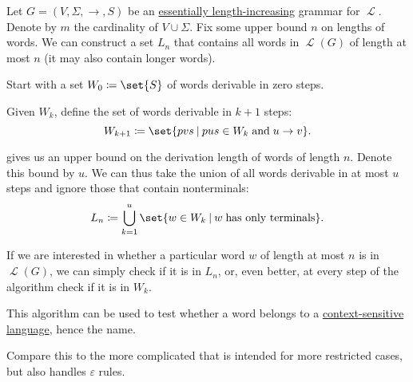 \begin{algorithm}\label{alg:length_increasing_grammar}
  Let \( G = (V, \Sigma, \to, S) \) be an \hyperref[def:length_increasing_grammar]{essentially length-increasing} grammar for \( \mscrL \). Denote by \( m \) the cardinality of \( V \cup \Sigma \). Fix some upper bound \( n \) on lengths of words. We can construct a set \( L_n \) that contains all words in \( \mscrL(G) \) of length at most \( n \) (it may also contain longer words).

  \begin{thmenum}
     Start with a set \( W_0 \coloneqq \set{ S } \) of words derivable in zero steps.

     Given \( W_k \), define the set of words derivable in \( k + 1 \) steps:
    \begin{equation*}
      W_{k+1} \coloneqq \set{ p v s \given p u s \in W_k \T{and} u \to v }.
    \end{equation*}

      gives us an upper bound on the derivation length of words of length \( n \). Denote this bound by \( u \). We can thus take the union of all words derivable in at most \( u \) steps and ignore those that contain nonterminals:
    \begin{equation*}
      L_n \coloneqq \bigcup_{k=1}^u \set{ w \in W_k \given w \T{has only terminals} }.
    \end{equation*}

     If we are interested in whether a particular word \( w \) of length at most \( n \) is in \( \mscrL(G) \), we can simply check if it is in \( L_n \), or, even better, at every step of the algorithm check if it is in \( W_k \).
  \end{thmenum}
\end{algorithm}
\begin{comments}
  \item This algorithm can be used to test whether a word belongs to a \hyperref[def:chomsky_hierarchy/context_sensitive]{context-sensitive language}, hence the name.

  \item Compare this to the more complicated  that is intended for more restricted cases, but also handles \( \varepsilon \) rules.
\end{comments}

